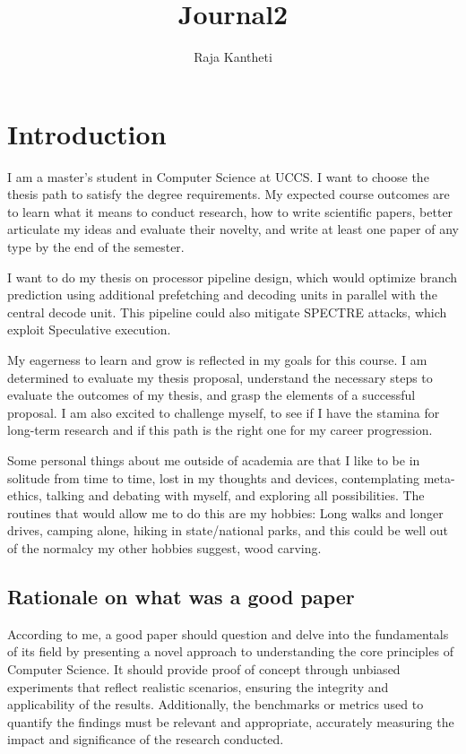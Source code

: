 \documentclass{article}
\title{Journal2}
\author{Raja Kantheti}
\begin{document}
\maketitle

\section{Introduction}
I am a master's student in Computer Science at UCCS. I want to choose the thesis path to satisfy the degree requirements. My expected course outcomes are to learn what it means to conduct research, how to write scientific papers, better articulate my ideas and evaluate their novelty, and write at least one paper of any type by the end of the semester.

I want to do my thesis on processor pipeline design, which would optimize branch prediction using additional prefetching and decoding units in parallel with the central decode unit. This pipeline could also mitigate SPECTRE attacks, which exploit Speculative execution. 

My eagerness to learn and grow is reflected in my goals for this course. I am determined to evaluate my thesis proposal, understand the necessary steps to evaluate the outcomes of my thesis, and grasp the elements of a successful proposal. I am also excited to challenge myself, to see if I have the stamina for long-term research and if this path is the right one for my career progression.

Some personal things about me outside of academia are that I like to be in solitude from time to time, lost in my thoughts and devices, contemplating meta-ethics, talking and debating with myself, and exploring all possibilities. The routines that would allow me to do this are my hobbies: Long walks and longer drives, camping alone, hiking in state/national parks, and this could be well out of the normalcy my other hobbies suggest, wood carving. 
\subsection[short]{Rationale on what was a good paper}
According to me, a good paper should question and delve into the fundamentals of its field by presenting a novel approach to understanding the core principles of Computer Science. It should provide proof of concept through unbiased experiments that reflect realistic scenarios, ensuring the integrity and applicability of the results. Additionally, the benchmarks or metrics used to quantify the findings must be relevant and appropriate, accurately measuring the impact and significance of the research conducted. 
\end{document}
